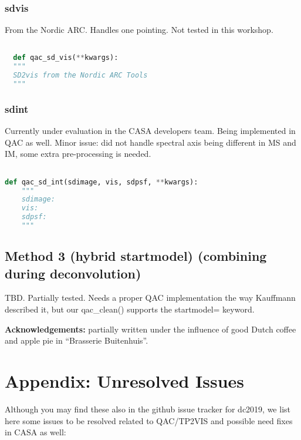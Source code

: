 \documentclass[12pt,a4paper]{article}
\begin{document}
\subsubsection{sdvis}

From the Nordic ARC. Handles one pointing. Not tested in this workshop.

\begin{lstlisting}[language=Python]

  def qac_sd_vis(**kwargs):
  """
  SD2vis from the Nordic ARC Tools
  """

\end{lstlisting}


\subsubsection{sdint}

Currently under evaluation in the CASA developers team.  Being implemented in QAC as well.
Minor issue: did not handle spectral axis being different in MS and IM, some extra pre-processing
is needed.

\begin{lstlisting}[language=Python]

def qac_sd_int(sdimage, vis, sdpsf, **kwargs):
    """
    sdimage:
    vis:
    sdpsf:
    """

\end{lstlisting}


\subsection{Method 3 (hybrid startmodel) (combining during deconvolution)}

TBD. Partially tested. Needs a proper QAC implementation the way Kauffmann described it, but our qac\_clean() supports the
startmodel= keyword.

\bigskip
{\bf Acknowledgements:} partially written under the influence of good Dutch coffee and apple pie in ``Brasserie Buitenhuis''.

\clearpage
\section{Appendix: Unresolved Issues}

Although you may find these also in the github issue tracker for dc2019, we list here some issues to be resolved related to QAC/TP2VIS
and possible need fixes in CASA as well:
\end{document}
